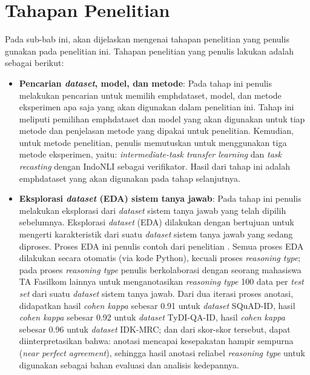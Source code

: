\section{Tahapan Penelitian}
\label{3.2}
Pada sub-bab ini, akan dijelaskan mengenai tahapan penelitian yang penulis gunakan pada penelitian ini. Tahapan penelitian yang penulis lakukan adalah sebagai berikut:

\begin{itemize}
    
    \item \textbf{Pencarian \emph{dataset}, model, dan metode}: Pada tahap ini penulis melakukan pencarian untuk memilih emph{dataset}, model, dan metode eksperimen apa saja yang akan digunakan dalam penelitian ini. Tahap ini meliputi pemilihan emph{dataset} dan model yang akan digunakan untuk tiap metode dan penjelasan metode yang dipakai untuk penelitian. Kemudian, untuk metode penelitian, penulis memutuskan untuk menggunakan tiga metode eksperimen, yaitu: \emph{intermediate-task transfer learning} dan \emph{task recasting} dengan IndoNLI sebagai verifikator. Hasil dari tahap ini adalah emph{dataset} yang akan digunakan pada tahap selanjutnya.

    \item \textbf{Eksplorasi \emph{dataset} (EDA) sistem tanya jawab}: Pada tahap ini penulis melakukan eksplorasi dari \emph{dataset} sistem tanya jawab yang telah dipilih sebelumnya. Eksplorasi \emph{dataset} (EDA) dilakukan dengan bertujuan untuk mengerti karakteristik dari suatu \emph{dataset} sistem tanya jawab yang sedang diproses. Proses EDA ini penulis contoh dari penelitian \citep{nguyen-etal-2020-vietnamese, rajpurkar-etal-2016-squad}. Semua proses EDA dilakukan secara otomatis (via kode Python), kecuali proses \emph{reasoning type}; pada proses \emph{reasoning type} penulis berkolaborasi dengan seorang mahasiswa TA Fasilkom lainnya untuk menganotasikan \emph{reasoning type} 100 data per \emph{test set} dari suatu \emph{dataset} sistem tanya jawab. Dari dua iterasi proses anotasi, didapatkan hasil \emph{cohen kappa} sebesar 0.91 untuk \emph{dataset} SQuAD-ID, hasil \emph{cohen kappa} sebesar 0.92 untuk \emph{dataset} TyDI-QA-ID, hasil \emph{cohen kappa} sebesar 0.96 untuk \emph{dataset} IDK-MRC; dan dari skor-skor tersebut, dapat diinterpretasikan bahwa: anotasi mencapai kesepakatan hampir sempurna (\emph{near perfect agreement}), sehingga hasil anotasi reliabel \emph{reasoning type} untuk digunakan sebagai bahan evaluasi dan analisis kedepannya.


\end{itemize}

